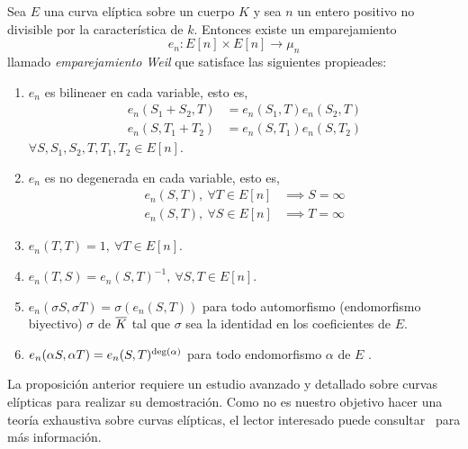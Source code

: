\begin{proposicion}\label{pp:endomorfismo Weil}
	Sea $E$ una curva elíptica sobre un cuerpo $K$ y sea $n$ un entero positivo no divisible por la característica de $k$. Entonces existe un emparejamiento
	$$
		e_n : E[n] \times E[n] \to \mu_n
	$$
	llamado \emph{emparejamiento Weil} que satisface las siguientes propieades:
	\begin{enumerate}
		\item $e_n$ es bilineaer en cada variable, esto es,
			\begin{align*}
				e_n(S_1 + S_2, T) &= e_n(S_1, T) e_n(S_2, T) \\
				e_n(S, T_1 + T_2) &= e_n(S, T_1) e_n(S, T_2)
			\end{align*}
		$\forall S, S_1, S_2, T, T_1, T_2 \in E[n]$.

		\item $e_n$ es no degenerada en cada variable, esto es,
			\begin{align*}
				e_n(S, T), \ \forall T \in E[n] &\implies S = \infty \\
				e_n(S, T), \ \forall S \in E[n] &\implies T = \infty
			\end{align*}

		\item $e_n(T, T) = 1, \ \forall T \in E[n]$.

		\item $e_n(T, S) = e_n(S, T)^{-1}, \ \forall S, T \in E[n]$.

		\item $e_n(\sigma S, \sigma T) = \sigma(e_n(S, T))$ para todo automorfismo (endomorfismo biyectivo) $\sigma$ de $\overline{K}$ tal que $\sigma$ sea la identidad en los coeficientes de $E$.

		\item $e_n(\alpha S, \alpha T) = e_n(S, T)^{\deg(\alpha)}$ para todo endomorfismo $\alpha$ de $E$ .
	\end{enumerate}
\end{proposicion}

La proposición anterior requiere un estudio avanzado y detallado sobre curvas elípticas para realizar su demostración. Como no es nuestro objetivo hacer una teoría exhaustiva sobre curvas elípticas, el lector interesado puede consultar~\cite[cap. 11]{Washington:2008} para más información.

